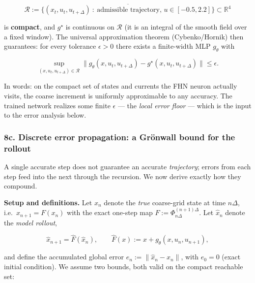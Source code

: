 \documentclass[
  11pt,
]{article}
\providecommand{\gt}{>}
\begin{document}
\[
\mathcal{R}:=\overline{\big\{(x_{t},u_{t},u_{t+\Delta})\ :\ \text{admissible trajectory, }u\in[-0.5,2.2]\big\}}\subset\mathbb{R}^{4}
\tag{8.11}
\]

is \textbf{compact}, and \(g^{\star}\) is continuous on \(\mathcal{R}\)
(it is an integral of the smooth field over a fixed window). The
universal approximation theorem (Cybenko/Hornik) then guarantees: for
every tolerance \(\epsilon\gt 0\) there exists a finite-width MLP
\(g_{\theta}\) with

\[
\sup_{(x,u_{t},u_{t+\Delta})\in\mathcal{R}}\big\|g_{\theta}(x,u_{t},u_{t+\Delta})-g^{\star}(x,u_{t},u_{t+\Delta})\big\|\le\epsilon.
\tag{8.12}
\]

In words: on the compact set of states and currents the FHN neuron
actually visits, the coarse increment is uniformly approximable to any
accuracy. The trained network realizes some finite \(\epsilon\) --- the
\emph{local error floor} --- which is the input to the error analysis
below.

\subsubsection{8c. Discrete error propagation: a Grönwall bound for the
rollout}\label{c.-discrete-error-propagation-a-gruxf6nwall-bound-for-the-rollout}

A single accurate step does not guarantee an accurate \emph{trajectory};
errors from each step feed into the next through the recursion. We now
derive exactly how they compound.

\textbf{Setup and definitions.} Let \(x_{n}\) denote the \emph{true}
coarse-grid state at time \(n\Delta\), i.e.~\(x_{n+1}=F(x_{n})\) with
the exact one-step map \(F:=\Phi_{n\Delta}^{(n+1)\Delta}\). Let
\(\widehat{x}_{n}\) denote the \emph{model rollout},

\[
\widehat{x}_{n+1}=\widehat{F}(\widehat{x}_{n}),\qquad \widehat{F}(x):=x+g_{\theta}(x,u_{n},u_{n+1}),
\tag{8.13}
\]

and define the accumulated global error
\(e_{n}:=\big\|\widehat{x}_{n}-x_{n}\big\|\), with \(e_{0}=0\) (exact
initial condition). We assume two bounds, both valid on the compact
reachable set:
\end{document}
